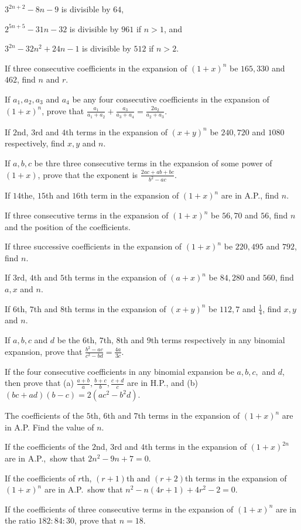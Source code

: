   \item $3^{2n + 2} - 8n  - 9$ is divisible by $64$,
  \item $2^{5n + 5} - 31n - 32$ is divisible by $961$ if $n > 1$, and
  \item $3^{2n} - 32n^2 + 24n - 1$ is divisible by $512$ if $n > 2$.
  \stopitemize
\item If three consecutive coefficients in the expansion of $(1 + x)^n$ be $165, 330$ and $462$, find $n$ and $r$.
\item If $a_1, a_2, a_3$ and $a_4$ be any four consecutive coefficients in the expansion of $(1 + x)^n$, prove that $\frac{a_1}{a_1
  + a_2} + \frac{a_3}{a_3 + a_4} = \frac{2a_2}{a_2 + a_3}$.
\item If $2$nd, $3$rd and $4$th terms in the expansion of $(x + y)^n$ be $240, 720$ and $1080$ respectively, find $x, y$ and $n$.
\item If $a, b, c$ be thre three consecutive terms in the expansion of some power of $(1 + x)$, prove that the exponent is
  $\frac{2ac + ab + bc}{b^2 - ac}$.
\item If $14$the, $15$th and $16$th term in the expansion of $(1 + x)^n$ are in A.P., find $n$.
\item If three consecutive terms in the expansion of $(1 + x)^n$ be $56, 70$ and $56$, find $n$ and the position of the
  coefficients.
\item If three successive coefficients in the expansion of $(1 + x)^n$ be $220, 495$ and $792$, find $n$.
\item If $3$rd, $4$th and $5$th terms in the expansion of $(a + x)^n$ be $84, 280$ and $560$, find $a, x$ and $n$.
\item If $6$th, $7$th and $8$th terms in the expansion of $(x + y)^n$ be $112, 7$ and $\frac{1}{4}$, find $x, y$ and $n$.
\item If $a, b, c$ and $d$ be the $6$th, $7$th, $8$th and $9$th terms respectively in any binomial expansion, prove that $\frac{b^2
  - ac}{c^2 - bd} = \frac{4a}{3c}$.
\item If the four consecutive coefficients in any binomial expansion be $a, b, c,$ and $d$, then prove that (a) $\frac{a + b}{a},
  \frac{b + c}{b}, \frac{c + d}{c}$ are in H.P., and (b) $(bc + ad)(b - c) = 2(ac^2 - b^2d)$.
\item The coefficients of the $5$th, $6$th and $7$th terms in the expansion of $(1 + x)^n$ are in A.P. Find the value of $n$.
\item If the coefficients of the $2$nd, $3$rd and $4$th terms in the expansion of $(1 + x)^{2n}$ are in A.P.,\ show that $2n^2 -9n
  + 7 = 0$.
\item If the coefficients of $r$th, $(r + 1)$th and $(r + 2)$th terms in the expansion of $(1 + x)^n$ are in A.P.\ show that $n^2 -
  n(4r + 1) + 4r^2 - 2 = 0$.
\item If the coefficients of three consecutive terms in the expansion of $(1 + x)^n$ are in the ratio $182:84:30$, prove that $n =
  18$.
\stopitemize

